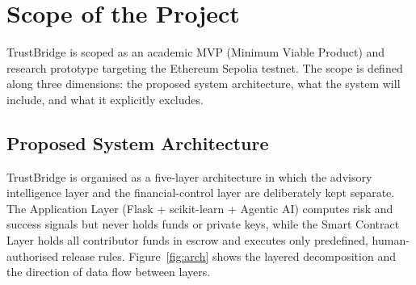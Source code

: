 \chapter{Scope of the Project}

TrustBridge is scoped as an academic MVP (Minimum Viable Product) and research prototype targeting the Ethereum Sepolia testnet. The scope is defined along three dimensions: the proposed system architecture, what the system will include, and what it explicitly excludes.

\section{Proposed System Architecture}

TrustBridge is organised as a five-layer architecture in which the advisory intelligence layer and the financial-control layer are deliberately kept separate. The Application Layer (Flask + scikit-learn + Agentic AI) computes risk and success signals but never holds funds or private keys, while the Smart Contract Layer holds all contributor funds in escrow and executes only predefined, human-authorised release rules. Figure~\ref{fig:arch} shows the layered decomposition and the direction of data flow between layers.

